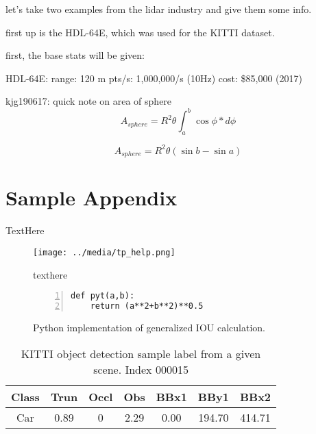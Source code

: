 let's take two examples from the lidar industry and give them some info. 

first up is the HDL-64E, which was used for the KITTI dataset. 

first, the base stats will be given: 


HDL-64E:
range: 120 m
pts/s: 1,000,000/s (10Hz)
cost: \$85,000 (2017)














kjg190617: quick note on area of sphere
$$ A_{sphere}=R^2\theta \int_{a}^{b}\cos\phi*d\phi $$

$$ A_{sphere}=R^2\theta (\sin{b} - \sin{a})$$



\newpage
\section{Sample Appendix}
TextHere

\begin{figure}[h] %
    \texttt{[image: ../media/tp\_help.png]}
    \caption{texthere}
    \label{delme_figure} %
\end{figure}


\begin{figure}[h] %
\begin{lstlisting}[numbers=left]  %note: 'tex' is for 
def pyt(a,b):
    return (a**2+b**2)**0.5
\end{lstlisting}
\onehalfspacing %
\caption{Python implementation of generalized IOU calculation.}
\label{delme_code} %
\end{figure}

\begin{table}[h]
\centering
\caption{KITTI object detection sample label from a given scene. Index 000015}
\begin{tabular}{|c|c|c|c|c|c|c|}
\hline
Class & Trun & Occl & Obs  & BBx1  & BBy1   & BBx2  \\
\hline
Car   & 0.89       & 0         & 2.29 & 0.00  & 194.70 & 414.71 \\
\hline
\end{tabular}


\label{SampleTable}
\end{table}



